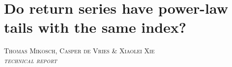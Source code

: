 \chapter[Do return series have power-law tails with the same
  index?]{{\huge Do return series have power-law tails with the same
    index?}}
\label{ch:TailParameters}

\begin{center}
\textsc{Thomas Mikosch, Casper de Vries \& Xiaolei Xie\\
{\em technical report}}
\end{center}


